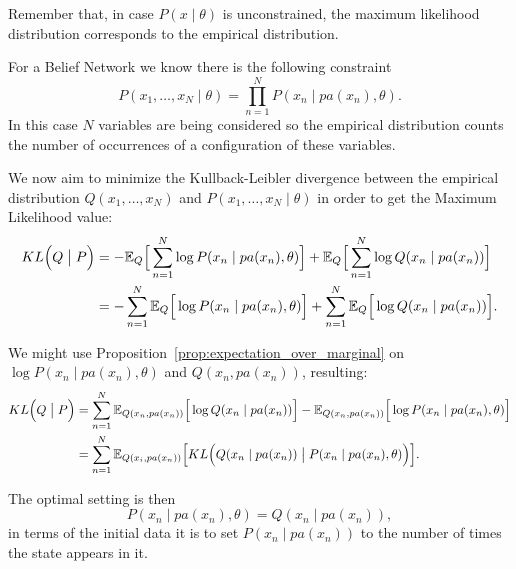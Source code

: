 
 Remember that, in case \(P(x \mid \theta)\) is unconstrained, the maximum likelihood distribution corresponds to the empirical distribution.

 For a Belief Network we know there is the following constraint
 \[
   P(x_{1}, \dots, x_{N} \mid \theta) = \prod_{n = 1}^N P(x_n  \mid  pa(x_n), \theta).
 \]
 In this case \( N \) variables are being considered so the empirical distribution counts the number of occurrences of a configuration of these variables.

 We now aim to minimize the Kullback-Leibler divergence between the empirical
 distribution \(Q(x_1,\dots,x_N)\) and \(P(x_1, \dots, x_N \mid \theta)\) in order to get the Maximum Likelihood value:
 \[
   \begin{aligned}
   KL\Big(Q \bigm| P\Big) &= - \mathbb{E}_{Q}\Big[\sum_{n = 1}^N\log{P(x_n \mid pa(x_n), \theta)}\Big] +
   \mathbb{E}_{Q}\Big[\sum_{n = 1}^N\log{Q(x_n \mid pa(x_n))}\Big]
   \\ &= - \sum_{n = 1}^N \mathbb{E}_{Q}\Big[\log{P(x_n \mid pa(x_n), \theta)}\Big] + \sum_{n =
     1}^N \mathbb{E}_{Q}\Big[\log{Q(x_n \mid pa(x_n))}\Big].
   \end{aligned}
 \]

We might use Proposition~\ref{prop:expectation_over_marginal} on \(\log{P(x_n \mid pa(x_n), \theta)}\) and \(Q(x_{n}, pa(x_{n}))\), resulting:
 \[
   \begin{aligned}
     KL\Big(Q \bigm| P\Big) &= \sum_{n = 1}^N \mathbb{E}_{Q(x_n,pa(x_n))}\Big[\log{Q(x_n \mid pa(x_n))}\Big] - \mathbb{E}_{Q(x_n,pa(x_n))}\Big[\log{P(x_n \mid pa(x_n), \theta)}\Big]\\
     &= \sum_{n = 1}^N \mathbb{E}_{Q(x_i,pa(x_n))}\Big[KL\Big(Q(x_n \mid pa(x_n)) \bigm| P(x_n \mid pa(x_n), \theta)\Big)\Big].
   \end{aligned}
 \]

 The optimal setting is then
 \[
   P(x_n \mid pa(x_n), \theta) = Q(x_n \mid pa(x_n)),
 \]
 in terms of the initial data it is to set \(P(x_n \mid pa(x_n))\) to the number of
 times the state appears in it.
